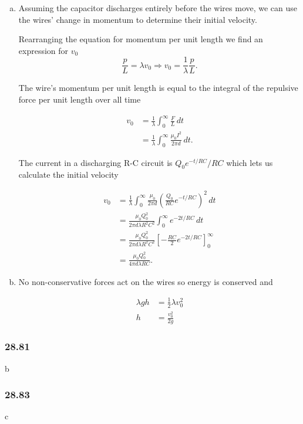 \documentclass{article}
\begin{document}
\begin{enumerate}[(a)]
  \item Assuming the capacitor discharges entirely before the wires move, we can use the wires' change in momentum to determine their initial velocity.

        Rearranging the equation for momentum per unit length we find an expression for $v_0$ \[\frac{p}{L} = \lambda v_0 \Rightarrow v_0 = \frac{1}{\lambda} \frac{p}{L}.\]

        The wire's momentum per unit length is equal to the integral of the repulsive force per unit length over all time

        \begin{align*}
          v_0 & = \frac{1}{\lambda} \int_0^\infty \frac{F}{L} \,dt                \\
              & = \frac{1}{\lambda} \int_0^\infty \frac{\mu_0 I^2}{2 \pi d} \,dt.
        \end{align*}

        The current in a discharging R-C circuit is $Q_0 e^{-t / R C} / R C$ which lets us calculate the initial velocity

        \begin{align*}
          v_0 & = \frac{1}{\lambda} \int_0^\infty \frac{\mu_0}{2 \pi d} \left( \frac{Q_0}{R C} e^{-t / R C} \right)^2 \,dt \\
              & = \frac{\mu_0 Q_0^2}{2 \pi d \lambda R^2 C^2} \int_0^\infty e^{-2 t / R C} \,dt                            \\
              & = \frac{\mu_0 Q_0^2}{2 \pi d \lambda R^2 C^2} \left[ -\frac{R C}{2} e^{-2 t / R C} \right]_0^\infty        \\
              & = \frac{\mu_0 Q_0^2}{4 \pi d \lambda R C}.
        \end{align*}

  \item No non-conservative forces act on the wires so energy is conserved and

        \begin{align*}
          \lambda g h & = \frac{1}{2} \lambda v_0^2 \\
          h           & = \frac{v_0^2}{2 g}
        \end{align*}
\end{enumerate}

\subsubsection{28.81}

b

\subsubsection{28.83}

c
\end{document}
